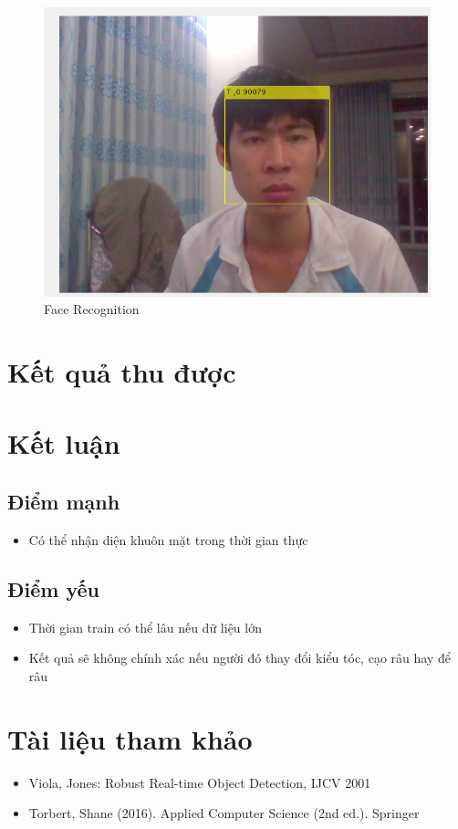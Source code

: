 \documentclass[a4paper]{article}
\begin{document}
\begin{figure} [H]
    \centering
    \includegraphics[scale=0.45]{face_recognition.png}
    \caption{ Face Recognition }
    \label{fig:ts}
\end{figure}

\section{Kết quả thu được}

\section{Kết luận}
\subsection{Điểm mạnh}
\begin{itemize}
    \item Có thể nhận diện khuôn mặt trong thời gian thực
\end{itemize}

\subsection{Điểm yếu}
\begin{itemize}
    \item Thời gian train có thể lâu nếu dữ liệu lớn
    \item Kết quả sẽ không chính xác nếu người đó thay đổi kiểu tóc, cạo râu hay để râu
\end{itemize}





\section{Tài liệu tham khảo}
\begin{itemize}
    \item  Viola, Jones: Robust Real-time Object Detection, IJCV 2001
    \item Torbert, Shane (2016). Applied Computer Science (2nd ed.). Springer
\end{itemize}


 
\end{document}

